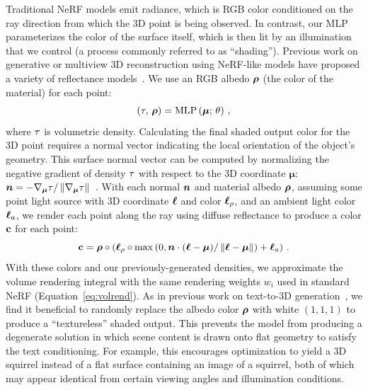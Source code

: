 \documentclass{article} %
\newcommand{\npos}[0]{\boldsymbol{\mu}}
\begin{document}
Traditional NeRF models emit radiance, which is RGB color conditioned on the ray direction from which the 3D point is being observed.
In contrast, our MLP parameterizes the color of the surface itself, which is then lit by an illumination that we control (a process commonly referred to as ``shading'').
Previous work on generative or multiview 3D reconstruction using NeRF-like models have proposed a variety of reflectance models~\citep{bi2020neural,boss2021nerd,srinivasan2021nerv,pan2022gan2x}.
We use an RGB albedo $\boldsymbol{\rho}$ (the color of the material) for each point:
\begin{equation}
    (\density, \, \albedo) = \mlp\left(\npos ; \, \modelweights \right) \, ,\label{eq:nerf_mlp}
\end{equation}
where $\tau$ is volumetric density. Calculating the final shaded output color for the 3D point requires a normal vector indicating the local orientation of the object's geometry. This  surface normal vector can be computed by normalizing the negative gradient of density $\tau$ with respect to the 3D coordinate $\npos$: $\boldsymbol{n} = - \nabla_{\boldsymbol{\mu}} \tau / \left\lVert\nabla_{\boldsymbol{\mu}} \tau\right\rVert\,$ \citep{yariv2020idr,srinivasan2021nerv}.
With each normal $\boldsymbol{n}$ and material albedo $\boldsymbol{\rho}$, assuming some point light source with 3D coordinate $\boldsymbol{\ell}$ and color $\boldsymbol{\ell}_{\rho}$, and an ambient light color $\boldsymbol{\ell}_a$, we render each point along the ray using diffuse reflectance \citep{lambert1760photometria, Ramamoorthi2001ASF} to produce a color $\mathbf{c}$ for each point:
\begin{equation}
    \mathbf{c} = \boldsymbol{\rho} \circ \left(\boldsymbol{\ell}_{\rho} \circ \operatorname{max}\left(0, \boldsymbol{n} \cdot (\boldsymbol{\ell} - \boldsymbol{\mu})/\left\lVert\boldsymbol{\ell} - \boldsymbol{\mu}\right\rVert\right) + \boldsymbol{\ell}_a\right) \, .
\label{eq:shading}
\end{equation}
With these colors and our previously-generated densities, we approximate the volume rendering integral with the same rendering weights $w_i$ used in standard NeRF (Equation~\ref{eq:volrend}).
As in previous work on text-to-3D generation~\citep{hong2022avatarclip,text2mesh}, we find it beneficial to randomly replace the albedo color $\boldsymbol{\rho}$ with white $(1, 1, 1)$ to produce a ``textureless'' shaded output.
This prevents the model from producing a degenerate solution in which scene content is drawn onto flat geometry to satisfy the text conditioning. For example, this encourages optimization to yield a 3D squirrel instead of a flat surface containing an image of a squirrel, both of which may appear identical from certain viewing angles and illumination conditions. %
\end{document}
